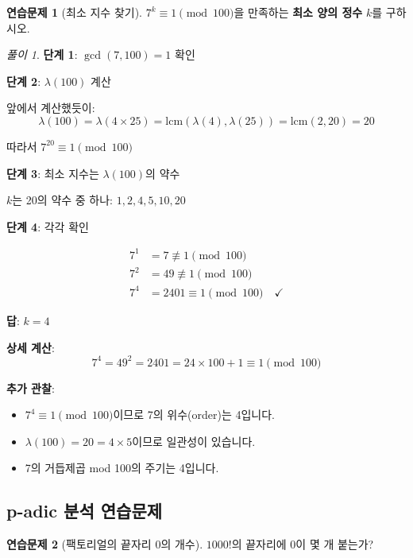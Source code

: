 \documentclass[11pt,a4paper]{article}
\theoremstyle{definition}
\newtheorem{exercise}{연습문제}[section]
\theoremstyle{remark}
\newtheorem*{solution}{풀이}
\begin{document}
\begin{exercise}[최소 지수 찾기]
$7^k \equiv 1 \pmod{100}$을 만족하는 \textbf{최소 양의 정수} $k$를 구하시오.
\end{exercise}

\begin{solution}

\textbf{단계 1}: $\gcd(7, 100) = 1$ 확인 \checkmark

\textbf{단계 2}: $\lambda(100)$ 계산

앞에서 계산했듯이:
\[\lambda(100) = \lambda(4 \times 25) = \text{lcm}(\lambda(4), \lambda(25)) = \text{lcm}(2, 20) = 20\]

따라서 $7^{20} \equiv 1 \pmod{100}$

\textbf{단계 3}: 최소 지수는 $\lambda(100)$의 약수

$k$는 20의 약수 중 하나: $1, 2, 4, 5, 10, 20$

\textbf{단계 4}: 각각 확인

\begin{align*}
7^1 &= 7 \not\equiv 1 \pmod{100} \\
7^2 &= 49 \not\equiv 1 \pmod{100} \\
7^4 &= 2401 \equiv 1 \pmod{100} \quad \checkmark
\end{align*}

\textbf{답}: $k = 4$

\textbf{상세 계산}:
\[7^4 = 49^2 = 2401 = 24 \times 100 + 1 \equiv 1 \pmod{100}\] \checkmark

\textbf{추가 관찰}:
\begin{itemize}
    \item $7^4 \equiv 1 \pmod{100}$이므로 7의 위수(order)는 4입니다.
    \item $\lambda(100) = 20 = 4 \times 5$이므로 일관성이 있습니다.
    \item 7의 거듭제곱 mod 100의 주기는 4입니다.
\end{itemize}
\end{solution}

\subsection{p-adic 분석 연습문제}

\begin{exercise}[팩토리얼의 끝자리 0의 개수]
$1000!$의 끝자리에 0이 몇 개 붙는가?
\end{exercise}
\end{document}
